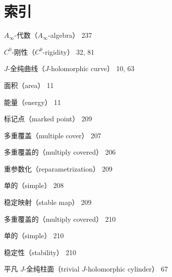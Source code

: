 \chapter*{索引}


\medskip
{\small
\setlength{\parindent}{0pt}
\setlength{\parskip}{1.2pt}
\raggedright
\noindent $A_\infty$-代数（$A_\infty$-algebra） 237\par
\noindent $C^0$-刚性（$C^0$-rigidity） 32, 81\par
\noindent $J$-全纯曲线（$J$-holomorphic curve） 10, 63\par
\noindent\hspace*{1.5em}面积（area） 11\par
\noindent\hspace*{1.5em}能量（energy） 11\par
\noindent\hspace*{1.5em}标记点（marked point） 209\par
\noindent\hspace*{1.5em}多重覆盖（multiple cover） 207\par
\noindent\hspace*{1.5em}多重覆盖的（multiply covered） 206\par
\noindent\hspace*{1.5em}重参数化（reparametrization） 209\par
\noindent\hspace*{1.5em}单的（simple） 208\par
\noindent\hspace*{1.5em}稳定映射（stable map） 209\par
\noindent\hspace*{3em}多重覆盖的（multiply covered） 210\par
\noindent\hspace*{3em}单的（simple） 210\par
\noindent\hspace*{3em}稳定性（stability） 210\par
\noindent\hspace*{1.5em}平凡 $J$-全纯柱面（trivial $J$-holomorphic cylinder） 67\par
}
